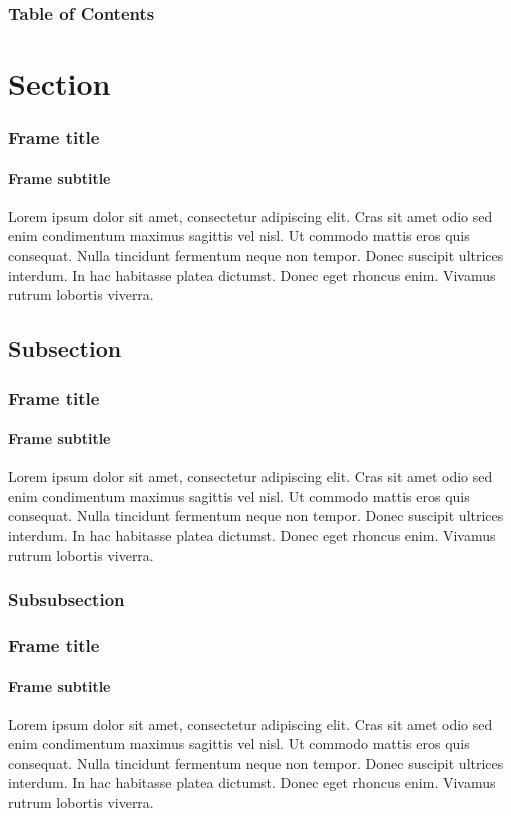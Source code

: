 \documentclass[10pt, english, pdftex]{template/UC3M_slides}
\author{Aitor Alonso Núñez}         %
\begin{document}
\maketitle %

\begin{frame}
    \frametitle{Table of Contents}
    \tableofcontents
\end{frame}

\section{Section}
\begin{frame}
    \frametitle{Frame title}
    \framesubtitle{Frame subtitle}
    Lorem ipsum dolor sit amet, consectetur adipiscing elit. Cras sit amet odio sed enim condimentum maximus sagittis vel nisl. Ut commodo mattis eros quis consequat. Nulla tincidunt fermentum neque non tempor. Donec suscipit ultrices interdum. In hac habitasse platea dictumst. Donec eget rhoncus enim. Vivamus rutrum lobortis viverra.
\end{frame}

\subsection{Subsection}
\begin{frame}
    \frametitle{Frame title}
    \framesubtitle{Frame subtitle}
    Lorem ipsum dolor sit amet, consectetur adipiscing elit. Cras sit amet odio sed enim condimentum maximus sagittis vel nisl. Ut commodo mattis eros quis consequat. Nulla tincidunt fermentum neque non tempor. Donec suscipit ultrices interdum. In hac habitasse platea dictumst. Donec eget rhoncus enim. Vivamus rutrum lobortis viverra.
\end{frame}

\subsubsection{Subsubsection}
\begin{frame}
    \frametitle{Frame title}
    \framesubtitle{Frame subtitle}
    Lorem ipsum dolor sit amet, consectetur adipiscing elit. Cras sit amet odio sed enim condimentum maximus sagittis vel nisl. Ut commodo mattis eros quis consequat. Nulla tincidunt fermentum neque non tempor. Donec suscipit ultrices interdum. In hac habitasse platea dictumst. Donec eget rhoncus enim. Vivamus rutrum lobortis viverra.
\end{frame}
\end{document}
